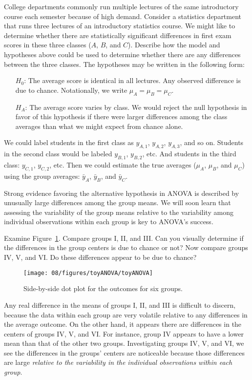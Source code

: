 \begin{example}{College departments commonly run multiple lectures of the same introductory course each semester because of high demand. Consider a statistics department that runs three lectures of an introductory statistics course. We might like to determine whether there are statistically significant differences in first exam scores in these three classes ($A$, $B$, and $C$). Describe how the model and hypotheses above could be used to determine whether there are any differences between the three classes.} \label{firstExampleForThreeStatisticsClassesAndANOVA}
The hypotheses may be written in the following form:
\begin{itemize}
\setlength{\itemsep}{0mm}
\item[$H_0$:] The average score is identical in all lectures. Any observed difference is due to chance. Notationally, we write $\mu_A=\mu_B=\mu_C$.
\item[$H_A$:] The average score varies by class. We would reject the null hypothesis in favor of this hypothesis if there were larger differences among the class averages than what we might expect from chance alone.
\end{itemize}
We could label students in the first class as $y_{A,1}$, $y_{A,2}$, $y_{A,3}$, and so on. Students in the second class would be labeled $y_{B,1}$, $y_{B,2}$, etc. And students in the third class: $y_{C,1}$, $y_{C,2}$, etc. Then we could estimate the true averages ($\mu_A$, $\mu_B$, and $\mu_C$) using the group averages: $\bar{y}_{A}$, $\bar{y}_B$, and $\bar{y}_C$.
\end{example}

Strong evidence favoring the alternative hypothesis in ANOVA is described by unusually large differences among the group means. We will soon learn that assessing the variability of the group means relative to the variability among individual observations within each group is key to ANOVA's success.

\begin{example}{Examine Figure~\ref{toyANOVA}. Compare groups I, II, and III. Can you visually determine if the differences in the group centers is due to chance or not? Now compare groups IV, V, and VI. Do these differences appear to be due to chance?}

\begin{figure}[h]
\centering
\texttt{[image: 08/figures/toyANOVA/toyANOVA]}
\caption{Side-by-side dot plot for the outcomes for six groups.}
\label{toyANOVA}
\end{figure}

Any real difference in the means of groups I, II, and III is difficult to discern, because the data within each group are very volatile relative to any differences in the average outcome. On the other hand, it appears there are differences in the centers of groups IV, V, and VI. For instance, group IV appears to have a lower mean than that of the other two groups. Investigating groups IV, V, and VI, we see the differences in the groups' centers are noticeable because those differences are large \emph{relative to the variability in the individual observations within each group}.
\end{example}


